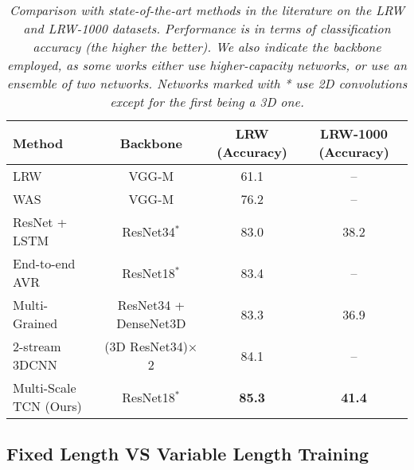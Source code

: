 \documentclass{article}
\begin{document}
\begin{table*}
\begin{center}
\begin{tabular}{|l|c|c|c|}
\hline
Method & Backbone & LRW (Accuracy) & LRW-1000 (Accuracy) \\
\hline
LRW \cite{chung16} & VGG-M & 61.1 & -- \\
WAS \cite{chung16b} & VGG-M & 76.2 & --\\
ResNet + LSTM \cite{stafylakis17} & ResNet34$^*$ & 83.0 & 38.2\footnotemark\\
End-to-end AVR \cite{petridis18} & ResNet18$^*$ & 83.4\footnotemark & --\\
Multi-Grained \cite{wang2019} & ResNet34 + DenseNet3D & 83.3 & 36.9 \\
2-stream 3DCNN \cite{weng19} & (3D ResNet34)$\times$ 2 & 84.1 & --\\
\hline
Multi-Scale TCN (Ours) & ResNet18$^*$ & \textbf{85.3} & \textbf{41.4} \\
\hline
\end{tabular}
\vspace{-2mm}
\end{center}
\caption{\it Comparison with state-of-the-art methods in the literature on the LRW and LRW-1000 datasets. Performance is in terms of classification accuracy (the higher the better). We also indicate the backbone employed, as some works either use higher-capacity networks, or use an ensemble of two networks. Networks marked with * use 2D convolutions except for the first being a 3D one.}
\label{tab:sota_visual}
\end{table*}




\subsection{Fixed Length VS Variable Length Training}
\label{ssec:variable_lengthResults}
\end{document}
